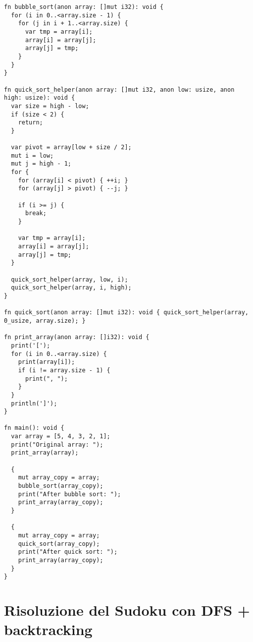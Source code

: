 \begin{mdframed}[style=examplestyle]
	\begin{verbatim}
fn bubble_sort(anon array: []mut i32): void {
  for (i in 0..<array.size - 1) {
    for (j in i + 1..<array.size) {
      var tmp = array[i];
      array[i] = array[j];
      array[j] = tmp;
    }
  }
}

fn quick_sort_helper(anon array: []mut i32, anon low: usize, anon high: usize): void {
  var size = high - low;
  if (size < 2) {
    return;
  }

  var pivot = array[low + size / 2];
  mut i = low;
  mut j = high - 1;
  for {
    for (array[i] < pivot) { ++i; }
    for (array[j] > pivot) { --j; }

    if (i >= j) {
      break;
    }

    var tmp = array[i];
    array[i] = array[j];
    array[j] = tmp;
  }

  quick_sort_helper(array, low, i);
  quick_sort_helper(array, i, high);
}

fn quick_sort(anon array: []mut i32): void { quick_sort_helper(array, 0_usize, array.size); }

fn print_array(anon array: []i32): void {
  print('[');
  for (i in 0..<array.size) {
    print(array[i]);
    if (i != array.size - 1) {
      print(", ");
    }
  }
  println(']');
}

fn main(): void {
  var array = [5, 4, 3, 2, 1];
  print("Original array: ");
  print_array(array);

  {
    mut array_copy = array;
    bubble_sort(array_copy);
    print("After bubble sort: ");
    print_array(array_copy);
  }

  {
    mut array_copy = array;
    quick_sort(array_copy);
    print("After quick sort: ");
    print_array(array_copy);
  }
}
	\end{verbatim}
\end{mdframed}

\section*{Risoluzione del Sudoku con DFS + backtracking}

\hfill

